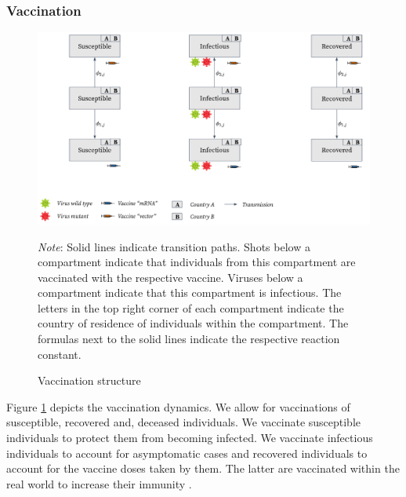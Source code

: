 \subsubsection{Vaccination}
\begin{figure}[h!]
\centering
\includegraphics[scale=0.3]{images/overview_vaccination.png}\\
\begin{flushleft}
\scriptsize{\textit{Note}: Solid lines indicate transition paths. Shots below a compartment indicate that individuals from this compartment are vaccinated with the respective vaccine. Viruses below a compartment indicate that this compartment is infectious. The letters in the top right corner of each compartment indicate the country of residence of individuals within the compartment. The formulas next to the solid lines indicate the respective reaction constant.}
\end{flushleft}
\caption{Vaccination structure}
\label{fig:model_vaccination_ov}
\end{figure}
Figure \ref{fig:model_vaccination_ov} depicts the vaccination dynamics. We allow for vaccinations of susceptible, recovered and, deceased individuals. We vaccinate susceptible individuals to protect them from becoming infected. We vaccinate infectious individuals to account for asymptomatic cases \citep{Byambasuren.2020} and recovered individuals to account for the vaccine doses taken by them. The latter are vaccinated within the real world to increase their immunity \citep{Skelly.2021}. \\

